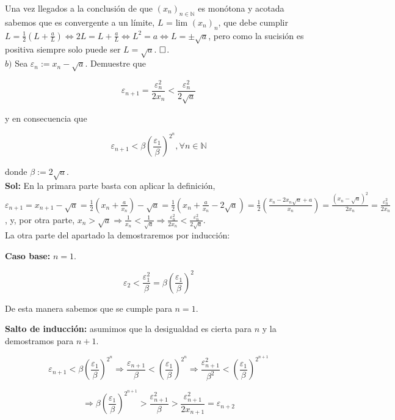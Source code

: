 \documentclass{article}
\begin{document}
Una vez llegados a la conclusión de que $(x_n)_{n \in \mathbb{N}}$ es monótona y acotada sabemos que es convergente a un límite, $L$ = lim $(x_n)_{n}$, que debe cumplir $L = \frac{1}{2}\left(L + \frac{a}{L}\right) \Longleftrightarrow 2L = L + \frac{a}{L} \Longleftrightarrow L^2 = a \Longleftrightarrow L = \pm\sqrt{a}$, pero como la sucisión es positiva siempre solo puede ser $L = \sqrt{a}$. $\hfill\square$. \\

$b)$ Sea $\varepsilon_n := x_n - \sqrt{a}$. Demuestre que 

\[\varepsilon_{n + 1} = \frac{\varepsilon_n^2}{2x_n} < \frac{\varepsilon_n^2}{2\sqrt{a}}\]

y en consecuencia que 

\[\varepsilon_{n + 1} < \beta \left(\frac{\varepsilon_1}{\beta}\right)^{2^n}, \forall n \in \mathbb{N}\] 

donde $\beta := 2\sqrt{a}$. \\

\textbf{Sol:} En la primara parte basta con aplicar la definición, $\varepsilon_{n + 1} = x_{n + 1} - \sqrt{a} = \frac{1}{2}\left(x_n + \frac{a}{x_n}\right) - \sqrt{a} = \frac{1}{2}\left(x_n + \frac{a}{x_n} - 2\sqrt{a}\right) = \frac{1}{2}\left(\frac{x_n - 2x_n\sqrt{a} + a}{x_n}\right) = \frac{(x_n - \sqrt{a})^2}{2x_n} = \frac{\varepsilon_n^2}{2x_n}$, y, por otra parte, $x_n > \sqrt{a} \Longrightarrow \frac{1}{x_n} < \frac{1}{\sqrt{a}} \Longrightarrow \frac{\varepsilon_n^2}{2x_n} < \frac{\varepsilon_n^2}{2\sqrt{a}}$. \\

La otra parte del apartado la demostraremos por inducción:

\textbf{Caso base:} $n = 1$.

\[\varepsilon_2 < \frac{\varepsilon_1^2}{\beta} = \beta\left(\frac{\varepsilon_1}{\beta}\right)^2\]

De esta manera sabemos que se cumple para $n = 1$.

\textbf{Salto de inducción:} asumimos que la desigualdad es cierta para $n$ y la demostramos para $n + 1$.

\[\varepsilon_{n + 1} < \beta\left(\frac{\varepsilon_1}{\beta}\right)^{2^n} \Longrightarrow \frac{\varepsilon_{n + 1}}{\beta} < \left(\frac{\varepsilon_1}{\beta}\right)^{2^n} \Longrightarrow \frac{\varepsilon_{n + 1}^2}{\beta^2} < \left(\frac{\varepsilon_1}{\beta}\right)^{2^{n + 1}}\]

\[\Longrightarrow \beta\left(\frac{\varepsilon_1}{\beta}\right)^{2^{n + 1}} > \frac{\varepsilon_{n + 1}^2}{\beta} > \frac{\varepsilon_{n + 1}^2}{2x_{n + 1}} = \varepsilon_{n + 2}\]
\end{document}
